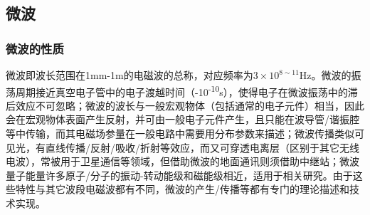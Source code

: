 \subsection{微波} %
	\label{sub:微波}
	\subsubsection{微波的性质} %
		\label{ssub:微波的性质}
		\par 微波即波长范围在1mm-1m的电磁波的总称，对应频率为$3\times 10^{8\sim 11}$Hz。微波的振荡周期接近真空电子管中的电子渡越时间（-10\textsuperscript{-10}s），使得电子在微波振荡中的滞后效应不可忽略；微波的波长与一般宏观物体（包括通常的电子元件）相当，因此会在宏观物体表面产生反射，并可由一般电子元件产生，且只能在波导管/谐振腔等中传输，而其电磁场参量在一般电路中需要用分布参数来描述；微波传播类似可见光，有直线传播/反射/吸收/折射等效应，而又可穿透电离层（区别于其它无线电波），常被用于卫星通信等领域，但借助微波的地面通讯则须借助中继站；微波量子能量许多原子/分子的振动-转动能级和磁能级相近，适用于相关研究。由于这些特性与其它波段电磁波都有不同，微波的产生/传播等都有专门的理论描述和技术实现。
